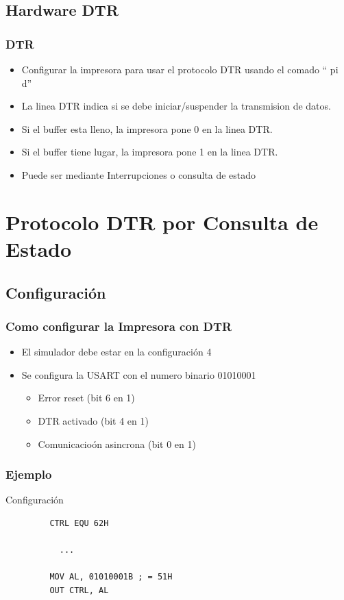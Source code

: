 \documentclass{beamer}
\begin{document}
\subsection{Hardware DTR}
\begin{frame}[fragile]
\frametitle{DTR}
\begin{itemize}
 \item Configurar la impresora para usar el protocolo DTR usando el comado `` pi d'' 
 \item La linea DTR indica si se debe iniciar/suspender la transmision de datos.
 \item Si el buffer esta lleno, la impresora pone 0 en la linea DTR.
 \item Si el buffer tiene lugar, la impresora pone 1 en la linea DTR.
 \item Puede ser mediante Interrupciones o consulta de estado
\end{itemize}

\end{frame}

\section{Protocolo DTR por Consulta de Estado}

\subsection{Configuración}
\begin{frame}[fragile]
\frametitle{Como configurar la Impresora con DTR}
\begin{itemize}
 \item El simulador debe estar en la configuración 4
 \item Se configura la USART con el numero binario 01010001
 \begin{itemize}
 \item Error reset (bit 6 en 1)
 \item DTR activado (bit 4 en 1)
 \item Comunicacioón asincrona (bit 0 en 1)
\end{itemize}
\end{itemize}
\end{frame}

\begin{frame}[fragile]
\frametitle{Ejemplo}
\begin{block}{Configuración}
 \begin{verbatim}
         CTRL EQU 62H
         
           ...
           
         MOV AL, 01010001B ; = 51H
         OUT CTRL, AL
 \end{verbatim}
\end{block}

\end{frame}
\end{document}

